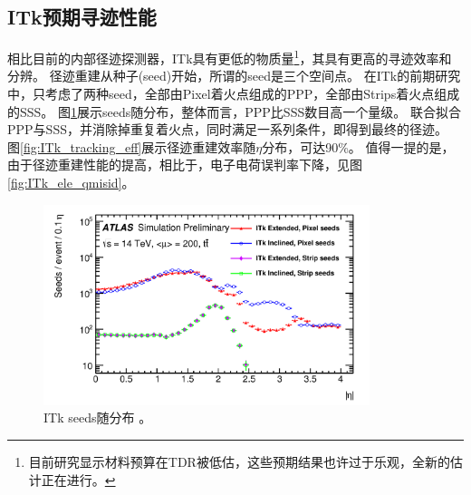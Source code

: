 \subsection{ITk预期寻迹性能}
相比目前的内部径迹探测器，ITk具有更低的物质量\footnote{目前研究显示材料预算在TDR被低估，这些预期结果也许过于乐观，全新的估计正在进行。}，其具有更高的寻迹效率和分辨。
径迹重建从种子(seed)开始，所谓的seed是三个空间点。
在ITk的前期研究中，只考虑了两种seed，全部由Pixel着火点组成的PPP，全部由Strips着火点组成的SSS。
图\ref{fig:ITk_seeds}展示seeds随\abseta 分布，整体而言，PPP比SSS数目高一个量级。
联合拟合PPP与SSS，并消除掉重复着火点，同时满足一系列条件，即得到最终的径迹。
图\ref{fig:ITk_tracking_eff}展示径迹重建效率随$\eta$分布，可达90\%。
值得一提的是，由于径迹重建性能的提高，相比于\RunTwo ，电子电荷误判率下降，见图\ref{fig:ITk_ele_qmisid}。
\begin{figure}[h]
\centering
 \includegraphics[width=0.85\textwidth]{fig/ITk_seeds.png}
 \caption{ITk seeds随\abseta 分布%
\cite{seeds_ITk}。}
 \label{fig:ITk_seeds}
\end{figure}
